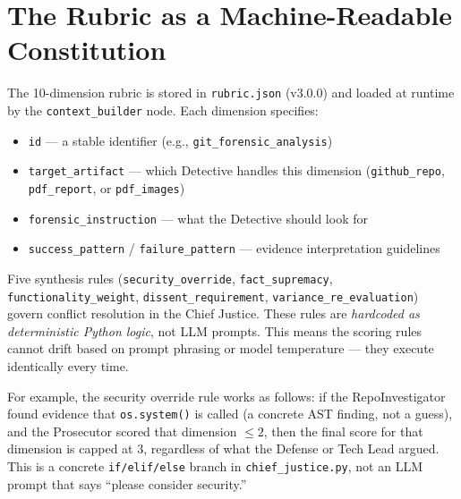 \documentclass[12pt,a4paper]{article}
\begin{document}
\section{The Rubric as a Machine-Readable Constitution}

The 10-dimension rubric is stored in \texttt{rubric.json} (v3.0.0) and loaded at runtime by the \texttt{context\_builder} node. Each dimension specifies:

\begin{itemize}[nosep]
  \item \texttt{id} --- a stable identifier (e.g., \texttt{git\_forensic\_analysis})
  \item \texttt{target\_artifact} --- which Detective handles this dimension (\texttt{github\_repo}, \texttt{pdf\_report}, or \texttt{pdf\_images})
  \item \texttt{forensic\_instruction} --- what the Detective should look for
  \item \texttt{success\_pattern} / \texttt{failure\_pattern} --- evidence interpretation guidelines
\end{itemize}

Five synthesis rules (\texttt{security\_override}, \texttt{fact\_supremacy}, \texttt{functionality\_weight}, \texttt{dissent\_requirement}, \texttt{variance\_re\_evaluation}) govern conflict resolution in the Chief Justice. These rules are \emph{hardcoded as deterministic Python logic}, not LLM prompts. This means the scoring rules cannot drift based on prompt phrasing or model temperature --- they execute identically every time.

For example, the security override rule works as follows: if the RepoInvestigator found evidence that \texttt{os.system()} is called (a concrete AST finding, not a guess), and the Prosecutor scored that dimension $\leq 2$, then the final score for that dimension is capped at 3, regardless of what the Defense or Tech Lead argued. This is a concrete \texttt{if/elif/else} branch in \texttt{chief\_justice.py}, not an LLM prompt that says ``please consider security.''
\end{document}
